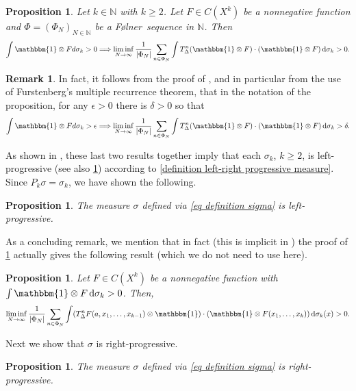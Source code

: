 \documentclass[letter, 11pt]{article}
\newcommand{\Folner}{F\o{}lner}
\newtheorem{prop}[theo]{Proposition}
\theoremstyle{definition}
\newtheorem{remark}[theo]{Remark}
\theoremstyle{plain}
\newcommand{\N}{\mathbb{N}}
\newcommand*\diff{\mathop{}\!\mathrm{d}}
\newcommand{\1}{\mathbbm{1}}
\begin{document}
\begin{prop}\label{recurrence-prop-k-2}
    Let $k\in \N$ with $k\geq 2$. Let $F\in C(X^k)$ be a nonnegative function and $\Phi=(\Phi_N)_{N\in \N}$ be a \Folner\ sequence in $\N$. Then
    $$\int \1 \otimes F d\sigma_k>0 \Longrightarrow \liminf_{N\to\infty}\frac{1}{|\Phi_N|} \sum_{n\in \Phi_N} \int T_\Delta^n(\1 \otimes F) \cdot (\1\otimes F) \diff\sigma_k>0.$$ 
\end{prop}
\begin{remark}\label{quantitative recurrence-prop-k-2}
In fact, it follows from the proof of \cite[Theorem $6.1$]{kmrr25}, and in particular from the use of Furstenberg's 
multiple recurrence theorem, that in the notation of the proposition, for any $\epsilon>0$ there is $\delta>0$ so that 
$$\int \1 \otimes F d\sigma_k> \epsilon \Longrightarrow \liminf_{N\to\infty}\frac{1}{|\Phi_N|} \sum_{n\in \Phi_N} \int T_\Delta^n(\1 \otimes F) \cdot (\1\otimes F) \diff\sigma_k>\delta.$$
\end{remark}
As shown in \cite[Section $6.1$]{kmrr25}, these last two results together 
imply that each $\sigma_k$, $k\geq 2$, is left-progressive (see also \cref{recurrence-prop-k}) according to \cref{definition left-right progressive measure}. Since $P_k\sigma=\sigma_k$, we have shown the following. 

\begin{prop}\label{left-progressive proof}
The measure $\sigma$ defined via \eqref{eq definition sigma} is 
left-progressive.    
\end{prop}

As a concluding remark, we mention that in fact (this is implicit in 
\cite{kmrr25}) the proof of \cref{left-progressive proof} actually gives the following result (which we do not need to use here).

\begin{prop}\label{recurrence-prop-k}
    Let $F\in C(X^k)$ be a nonnegative function with $\int \1 \otimes F \diff \sigma_k>0$. Then, 
    $$\liminf_{N\to\infty} \frac{1}{|\Phi_N|} \sum_{n\in \Phi_N} \int (T_\Delta^n F(a,x_1,\ldots,x_{k-1}) \otimes \1) \cdot (\1 \otimes F(x_1,\ldots,x_k)) \diff \sigma_k(x)>0.$$
\end{prop}

Next we show that $\sigma$ is right-progressive.

\begin{prop}\label{right-progressive proof}
The measure $\sigma$ defined via \eqref{eq definition sigma} is 
right-progressive.    
\end{prop}
\end{document}
